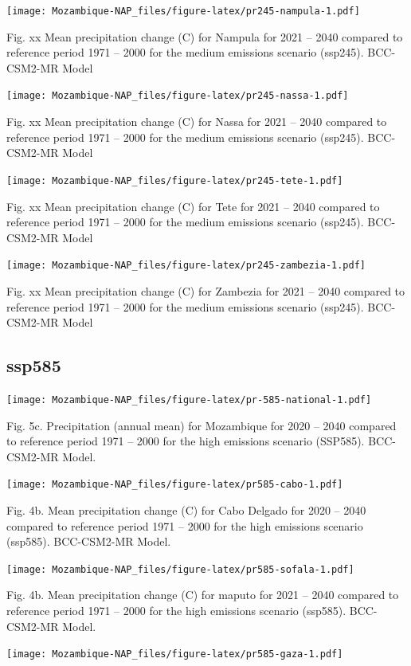 \documentclass[
]{book}
\begin{document}
\texttt{[image: Mozambique-NAP\_files/figure-latex/pr245-nampula-1.pdf]}

Fig. xx Mean precipitation change (C) for Nampula for 2021 -- 2040 compared to reference period 1971 -- 2000 for the medium emissions scenario (ssp245). BCC-CSM2-MR Model

\texttt{[image: Mozambique-NAP\_files/figure-latex/pr245-nassa-1.pdf]}

Fig. xx Mean precipitation change (C) for Nassa for 2021 -- 2040 compared to reference period 1971 -- 2000 for the medium emissions scenario (ssp245). BCC-CSM2-MR Model

\texttt{[image: Mozambique-NAP\_files/figure-latex/pr245-tete-1.pdf]}

Fig. xx Mean precipitation change (C) for Tete for 2021 -- 2040 compared to reference period 1971 -- 2000 for the medium emissions scenario (ssp245). BCC-CSM2-MR Model

\texttt{[image: Mozambique-NAP\_files/figure-latex/pr245-zambezia-1.pdf]}

Fig. xx Mean precipitation change (C) for Zambezia for 2021 -- 2040 compared to reference period 1971 -- 2000 for the medium emissions scenario (ssp245). BCC-CSM2-MR Model

\hypertarget{ssp585-1}{%
\subsection{ssp585}\label{ssp585-1}}

\texttt{[image: Mozambique-NAP\_files/figure-latex/pr-585-national-1.pdf]}

Fig. 5c. Precipitation (annual mean) for Mozambique for 2020 -- 2040 compared to reference period 1971 -- 2000 for the high emissions scenario (SSP585). BCC-CSM2-MR Model.

\texttt{[image: Mozambique-NAP\_files/figure-latex/pr585-cabo-1.pdf]}

Fig. 4b. Mean precipitation change (C) for Cabo Delgado for 2020 -- 2040 compared to reference period 1971 -- 2000 for the high emissions scenario (ssp585). BCC-CSM2-MR Model.

\texttt{[image: Mozambique-NAP\_files/figure-latex/pr585-sofala-1.pdf]}

Fig. 4b. Mean precipitation change (C) for maputo for 2021 -- 2040 compared to reference period 1971 -- 2000 for the high emissions scenario (ssp585). BCC-CSM2-MR Model.

\texttt{[image: Mozambique-NAP\_files/figure-latex/pr585-gaza-1.pdf]}
\end{document}
